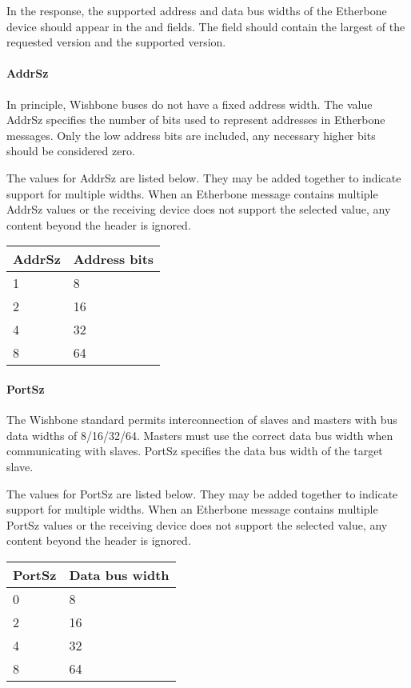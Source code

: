 \documentclass{article}
\begin{document}
In the response, the supported address and data bus widths of the Etherbone
device should appear in the  and  fields.
The  field should contain the largest of the
requested version and the supported version.

\paragraph{AddrSz} \label{field:AddrSz}

In principle, 
Wishbone buses do not have a fixed address width.
The value AddrSz specifies the number of bits used 
to represent addresses in Etherbone messages.
Only the low address bits are included,
any necessary higher bits should be considered zero.

The values for AddrSz are listed below.
They may be added together to indicate support for multiple widths.
When an Etherbone message contains multiple AddrSz values
or the receiving device does not support the selected value, 
any content beyond the header is ignored.

\vspace{1em}
\begin{tabular}{|l|l|}
\hline
AddrSz & Address bits \\
\hline
1 & 8 \\
2 & 16 \\
4 & 32 \\
8 & 64 \\
\hline
\end{tabular}

\paragraph{PortSz} \label{field:PortSz}
The Wishbone standard permits interconnection of slaves and masters 
with bus data widths of 8/16/32/64.
Masters must use the correct data bus width when communicating with slaves.
PortSz specifies the data bus width of the target slave.

The values for PortSz are listed below.
They may be added together to indicate support for multiple widths.
When an Etherbone message contains multiple PortSz values
or the receiving device does not support the selected value, 
any content beyond the header is ignored.

\vspace{1em}
\begin{tabular}{|l|l|}
\hline
PortSz & Data bus width \\
\hline
0 & 8 \\
2 & 16 \\
4 & 32 \\
8 & 64 \\
\hline
\end{tabular}
\end{document}
